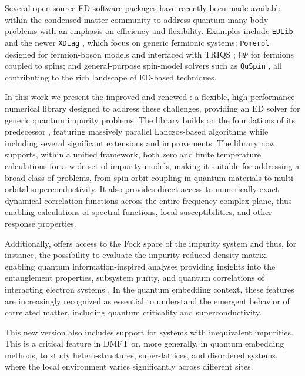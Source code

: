 \documentclass[edipack_sp.tex]{subfiles}
\begin{document}
Several open-source ED software packages have recently been made available within the condensed matter community to address quantum many-body problems with an emphasis on efficiency and flexibility. Examples include \texttt{EDLib} \cite{Iskakov2017} and the newer 
\texttt{XDiag} \cite{Wietek2025}, which focus on generic fermionic systems; 
\texttt{Pomerol} \cite{Antipov2015} designed for fermion-boson models and interfaced with TRIQS \cite{Parcollet2015CPC}; \texttt{H$\Phi$} \cite{Kawamura2017CPC,Ido2024CPC} 
for fermions coupled to spins; and general-purpose spin-model solvers such as 
\texttt{QuSpin} \cite{Weinberg2017SP,Weinberg2019SP}, all contributing to the 
rich landscape of ED-based techniques.


In this work we present the improved and renewed \NAME{}: a flexible, high-performance numerical library designed to address these challenges, providing an ED solver for generic quantum impurity problems. 
The library builds on the foundations of
its predecessor \cite{Amaricci2022CPC}, featuring massively parallel Lanczos-based algorithms \cite{Lanczos1950JRNBSB,Lehoucq1998,Maschhoff1996} while including several significant extensions and improvements. The library now supports, within a unified framework, both zero and finite temperature calculations \cite{Amaricci2022CPC,Capone2007PRB} for a wide set of impurity models, making it suitable for addressing a broad class of problems, from spin-orbit coupling in quantum materials to multi-orbital superconductivity. It also provides direct
access to numerically exact dynamical correlation functions across the
entire frequency complex plane, thus enabling calculations of spectral functions, local susceptibilities, and other response properties.

Additionally, \NAME offers access to the Fock space of
the impurity system and thus, for instance, the possibility to evaluate the impurity reduced density matrix, enabling quantum information-inspired analyses providing insights into the entanglement properties, subsystem purity, and quantum correlations of interacting electron systems \cite{Walsh2021PNAS,Bellomia2024PRB}.
In the quantum embedding context, these features are increasingly recognized as essential to understand the emergent behavior of correlated matter, including quantum criticality and superconductivity.


This new \NAME version also includes support for systems with inequivalent impurities. This is a critical feature in DMFT or, more generally, in quantum embedding methods, to study hetero-structures, super-lattices, and disordered systems, where the local environment varies significantly across different sites.
\end{document}

